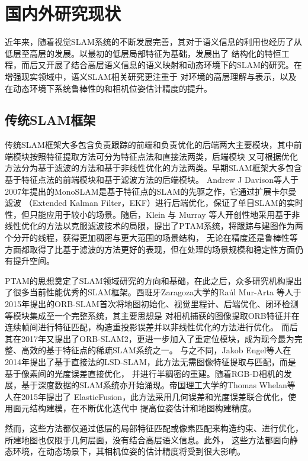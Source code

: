 \section{国内外研究现状}\label{sec:ResearchStatus}
近年来，随着视觉SLAM系统的不断发展完善，其对于语义信息的利用也经历了从低层至高层的发展。以最初的低层局部特征为基础，发展出了
结构化的特恒工程，而后又开展了结合高层语义信息的语义映射和动态环境下的SLAM的研究。在增强现实领域中，语义SLAM相关研究更注重于
对环境的高层理解与表示，以及在动态环境下系统鲁棒性的和相机位姿估计精度的提升。
\subsection{传统SLAM框架}
传统SLAM框架大多包含负责跟踪的前端和负责优化的后端两大主要模块，其中前端模块按照特征提取方法可分为特征点法和直接法两类，后端模块
又可根据优化方法分为基于滤波的方法和基于非线性优化的方法两类。早期SLAM框架大多包含基于特征点法的前端模块和基于滤波方法的后端模块。
Andrew J Davison等人于2007年提出的MonoSLAM是基于特征点的SLAM的先驱之作，它通过扩展卡尔曼滤波
（Extended Kalman Filter，EKF）进行后端优化，保证了单目SLAM的实时性，但只能应用于较小的场景。随后，Klein 与 Murray 等人开创性地采用基于非
线性优化的方法以克服滤波技术的局限，提出了PTAM\citep{Klein2007Parallel}系统，将跟踪与建图作为两个分开的线程，获得更加稠密与更大范围的场景结构，
无论在精度还是鲁棒性等方面都取得了比基于滤波的方法更好的表现，但在处理的场景规模和稳定性方面仍有提升空间。

PTAM的思想奠定了SLAM领域研究的方向和基础，在此之后，众多研究机构提出了很多当前性能优秀的SLAM框架。西班牙Zaragoza大学的Raúl Mur-Arta
等人于2015年提出的ORB-SLAM\citep{mur2015orb}首次将地图初始化、视觉里程计、后端优化、闭环检测等模块集成至一个完整系统，其主要思想是
对相机捕获的图像提取ORB\citep{Rublee2012ORB}特征并在连续帧间进行特征匹配，构造重投影误差并以非线性优化的方法进行优化。
而后其在2017年又提出了ORB-SLAM2\citep{mur2017orb}，更进一步加入了重定位模块，成为现今最为完整、高效的基于特征点的稀疏SLAM系统之一。
与之不同，Jakob Engel等人在2014年提出了基于直接法的LSD-SLAM\citep{Engel2014LSD}，此方法无需图像特征提取与匹配，而是基于像素间的光度误差直接优化，
并进行半稠密的重建。随着RGB-D相机的发展，基于深度数据的SLAM系统亦开始涌现。帝国理工大学的Thomas Whelan等人在2015年提出了
ElasticFusion\citep{whelan2015elasticfusion}，此方法采用几何误差和光度误差联合优化，使用面元结构建模，在不断优化迭代中
提高位姿估计和地图构建精度。

然而，这些方法都仅通过低层的局部特征匹配或像素匹配来构造约束、进行优化，所建地图也仅限于几何层面，没有结合高层语义信息。此外，
这些方法都面向静态环境，在动态场景下，其相机位姿的估计精度将受到很大影响。


